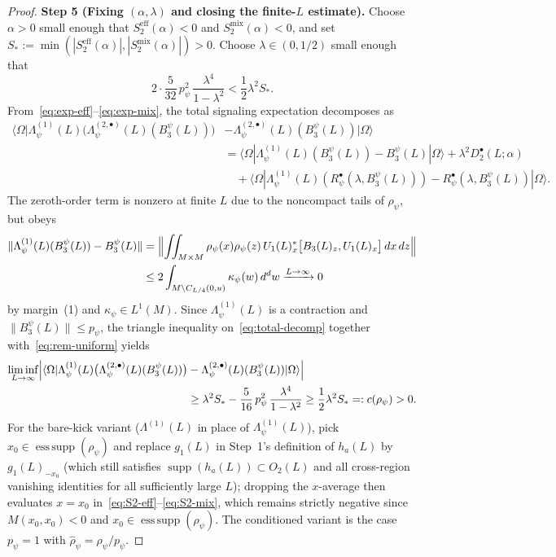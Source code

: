 \documentclass[11pt,a4paper]{article}
\theoremstyle{definition}
\theoremstyle{remark}
\newcommand{\supp}{\operatorname{supp}}
\newcommand{\esssupp}{\operatorname{ess\,supp}}
\newcommand{\ket}[1]{|#1\rangle}
\newcommand{\bra}[1]{\langle #1|}
\newcommand{\norm}[1]{\|#1\|}
\begin{document}
\begin{proof}
\medskip\noindent\textbf{Step 5 (Fixing $(\alpha,\lambda)$ and closing the finite-$L$ estimate).}
Choose $\alpha > 0$ small enough that $S_2^{\mathrm{eff}}(\alpha) < 0$ and $S_2^{\mathrm{mix}}(\alpha) < 0$, and set $S_* := \min(|S_2^{\mathrm{eff}}(\alpha)|, |S_2^{\mathrm{mix}}(\alpha)|) > 0$. Choose $\lambda\in(0,1/2)$ small enough that
\[
2\cdot\frac{5}{32}\,p_\psi^2\,\frac{\lambda^4}{1-\lambda^2} < \frac{1}{2}\lambda^2 S_*.
\]
From~\eqref{eq:exp-eff}--\eqref{eq:exp-mix}, the total signaling expectation decomposes as
\begin{equation}\label{eq:total-decomp}
\begin{aligned}
\bra{\Omega}\Lambda_\psi^{(1)}(L)\bigl(\Lambda_\psi^{(2,\bullet)}(L)(B_3^\psi(L))\bigr)
&- \Lambda_\psi^{(2,\bullet)}(L)(B_3^\psi(L))\ket{\Omega} \\
&= \bra{\Omega}\Lambda_\psi^{(1)}(L)(B_3^\psi(L)) - B_3^\psi(L)\ket{\Omega} + \lambda^2 D_2^{\bullet}(L;\alpha) \\
&\quad + \bra{\Omega}\Lambda_\psi^{(1)}(L)(R_\psi^{\bullet}(\lambda,B_3^\psi(L))) - R_\psi^{\bullet}(\lambda,B_3^\psi(L))\ket{\Omega}.
\end{aligned}
\end{equation}
The zeroth-order term is nonzero at finite $L$ due to the noncompact tails of $\rho_\psi$, but obeys
\begin{align*}
\norm{\Lambda_\psi^{(1)}(L)(B_3^\psi(L)) - B_3^\psi(L)}
&= \Bigl\|\iint_{M\times M}\rho_\psi(x)\rho_\psi(z)\,U_1(L)_x^*\bigl[B_3(L)_z, U_1(L)_x\bigr]\,dx\,dz\Bigr\| \\
&\le 2\int_{M\setminus C_{L/4}(0,u)}\kappa_\psi(w)\,d^dw \xrightarrow{L\to\infty} 0
\end{align*}
by margin~(1) and $\kappa_\psi\in L^1(M)$. Since $\Lambda_\psi^{(1)}(L)$ is a contraction and $\norm{B_3^\psi(L)}\le p_\psi$, the triangle inequality on~\eqref{eq:total-decomp} together with~\eqref{eq:rem-uniform} yields
\begin{align*}
\liminf_{L\to\infty}\Bigl|\bra{\Omega}\Lambda_\psi^{(1)}(L)\bigl(\Lambda_\psi^{(2,\bullet)}(L)(B_3^\psi(L))\bigr)
&- \Lambda_\psi^{(2,\bullet)}(L)(B_3^\psi(L))\ket{\Omega}\Bigr| \\
&\ge \lambda^2 S_* - \frac{5}{16}\,p_\psi^2\,\frac{\lambda^4}{1-\lambda^2}
\ge \frac{1}{2}\lambda^2 S_* =: c(\rho_\psi) > 0.
\end{align*}
For the bare-kick variant ($\Lambda^{(1)}(L)$ in place of $\Lambda_\psi^{(1)}(L)$), pick $x_0\in\esssupp(\rho_\psi)$ and replace $g_1(L)$ in Step~1's definition of $h_a(L)$ by $g_1(L)_{-x_0}$ (which still satisfies $\supp(h_a(L))\subset O_2(L)$ and all cross-region vanishing identities for all sufficiently large $L$); dropping the $x$-average then evaluates $x=x_0$ in~\eqref{eq:S2-eff}--\eqref{eq:S2-mix}, which remains strictly negative since $M(x_0,x_0)<0$ and $x_0\in\esssupp(\rho_\psi)$. The conditioned variant is the case $p_\psi=1$ with $\hat{\rho}_\psi = \rho_\psi/p_\psi$.
\end{proof}
\end{document}
